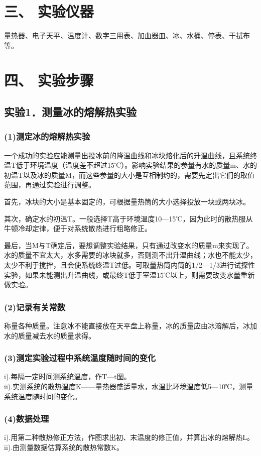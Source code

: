 \documentclass[11pt,a4paper,oneside]{article}
\begin{document}
\section*{三、 实验仪器}
量热器、电子天平、温度计、数字三用表、加血器皿、冰、水桶、停表、干拭布等。

\section*{四、 实验步骤}
\subsection*{实验1．测量冰的熔解热实验}
\subsubsection*{(1)测定冰的熔解热实验}
一个成功的实验应能测量出投冰前的降温曲线和冰块熔化后的升温曲线，且系统终温T低于环境温度（温度差不超过15℃）。影响实验结果的参量有水的质量m、水的初温T以及冰的质量M，而这些参量的大小是互相制约的，需要先定出它们的取值范围，再通过实验进行调整。
	
首先，冰块的大小是基本固定的，可根据量热筒的大小选择投放一块或两块冰。

其次，确定水的初温T。一般选择T高于环境温度10—15℃，因为此时的散热服从牛顿冷却定律，便于对系统散热进行粗略修正。

最后，当M与T确定后，要想调整实验结果，只有通过改变水的质量m来实现了。水的质量不宜太大，水多需要的冰块就多，否则测不出升温曲线；水也不能太少，太少不利于搅拌，且会使系统终温T过低。可取量热筒内筒的1/2—1/3进行试探性实验，如果未能测出升温曲线，或最终T低于室温15℃以上，则需要改变水量重新做实验。
\subsubsection*{(2)记录有关常数}
称量各种质量。注意冰不能直接放在天平盘上称量，冰的质量应由冰溶解后，冰加水的质量减去水的质量求得。
\subsubsection*{(3)测定实验过程中系统温度随时间的变化}
i).每隔一定时间测系统温度，作T—t图。\\
ii).实测系统的散热温度K——量热器盛适量水，水温比环境温度低5—10℃，测量系统温度随时间的变化。
\subsubsection*{(4)数据处理}
i).用第二种散热修正方法，作图求出初、末温度的修正值，并算出冰的熔解热L。\\
ii).由测量数据估算系统的散热常数K。
\end{document}
